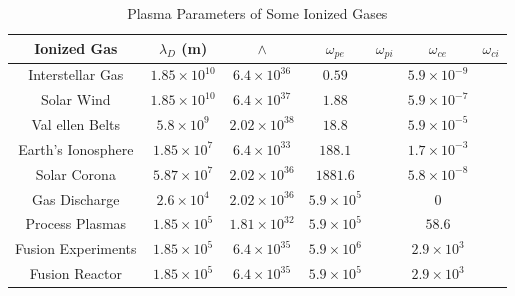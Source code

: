 \documentclass[11pt]{amsart}
\begin{document}
 \begin{table}
 \centering
\caption{\label{tab:1} Plasma Parameters of Some Ionized Gases}
\begin{tabular}{ccccccc}
 Ionized Gas&$\lambda_D$ (m)&$\wedge$&$\omega_{pe}$ 
&$\omega_{pi}$  &$\omega_{ce}$ &$\omega_{ci}$\\ \hline
 Interstellar Gas&$1.85\times 10^{10}$&$6.4\times 10^{36}$ &$0.59$&& $5.9\times 10^{-9}$\\
 Solar Wind&$1.85\times 10^{10}$&$6.4\times 10^{37}$&$1.88$&&$5.9\times 10^{-7}$\\
 Val ellen Belts&$5.8\times 10^{9}$&$2.02\times 10^{38}$&$18.8$&&$5.9\times 10^{-5}$\\
 Earth's Ionosphere&$1.85\times 10^{7}$&$6.4\times 10^{33}$&$188.1$&&$1.7\times 10^{-3}$\\
 Solar Corona&$5.87\times 10^{7}$&$2.02\times 10^{36}$ &$1881.6$&&$5.8\times 10^{-8}$\\
 Gas Discharge&$2.6\times 10^{4}$&$2.02\times 10^{36}$ &$5.9\times 10^{5}$&&$0$\\
 Process Plasmas&$1.85\times 10^{5}$&$1.81\times 10^{32}$ &$5.9\times 10^{5}$&&$58.6$\\
 Fusion Experiments &$1.85\times 10^{5}$&$6.4\times 10^{35}$ &$5.9\times 10^{6}$&&$2.9\times 10^{3}$\\
 Fusion Reactor&$1.85\times 10^{5}$&$6.4\times 10^{35}$ &$5.9\times 10^{5}$&&$2.9\times 10^{3}$\\
\end{tabular}
\end{table}
 
 
 
 
\end{document}
